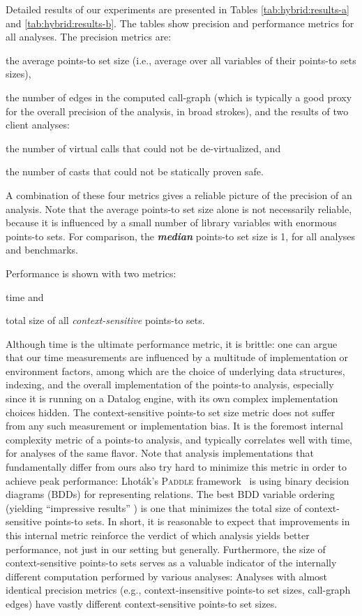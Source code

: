Detailed results of our experiments are presented in Tables \ref{tab:hybrid:results-a} and \ref{tab:hybrid:results-b}. The tables show precision and performance metrics for all analyses. The precision metrics are:
\begin{inparaenum}[(1)]
\item the average points-to set size (i.e., average over all variables of their
points-to sets sizes),
\item the number of edges in the computed call-graph (which is typically a good proxy for the overall precision of the analysis, in broad strokes), and
the results of two client analyses:
\item the number of virtual calls that could not be de-virtualized, and
\item the number of casts that could not be statically proven safe.
\end{inparaenum}
A combination of these four metrics gives a reliable picture of the precision of an analysis. Note that the average points-to set size alone is not necessarily reliable, because it is influenced by a small number of library variables with enormous points-to sets. For comparison, the \emph{\textbf{median}} points-to set size is 1, for all analyses and benchmarks.

Performance is shown with two metrics:
\begin{inparaenum}[(1)]
\item time and
\item total size of all \emph{context-sensitive} points-to sets.
\end{inparaenum}
Although time is the ultimate performance metric, it is brittle: one can argue that our time measurements are influenced by a multitude of implementation or environment factors, among which are the choice of underlying data structures, indexing, and the overall implementation of the points-to analysis, especially since it is running on a Datalog engine, with its own complex implementation choices hidden. The context-sensitive points-to set size metric does not suffer from any such measurement or implementation bias. It is the foremost internal complexity metric of a points-to analysis, and typically correlates well with time, for analyses of the same flavor. Note that analysis implementations that fundamentally differ from ours also try hard to minimize this metric in order to achieve peak performance: Lhot\'{a}k's \textsc{Paddle} framework~\cite{thesis:Lhotak} is using binary decision diagrams (BDDs) for representing relations. The best BDD variable ordering (yielding ``impressive results'' \cite{pldi:2003:Berndl}) is one that minimizes the total size of context-sensitive points-to sets. In short, it is reasonable to expect that improvements in this internal metric reinforce the verdict of which analysis yields better performance, not just in our setting but generally. Furthermore, the size of context-sensitive points-to sets serves as a valuable indicator of the internally different computation performed by various analyses: Analyses with almost identical precision metrics (e.g., context-insensitive points-to set sizes, call-graph edges) have vastly different context-sensitive points-to set sizes.


